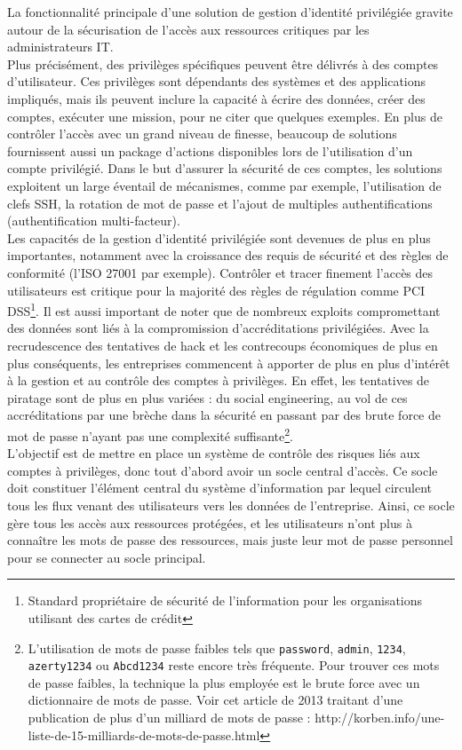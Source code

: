 La fonctionnalité principale d’une solution de gestion d’identité privilégiée gravite autour de la sécurisation de l’accès aux ressources critiques par les administrateurs IT.\\
Plus précisément, des privilèges spécifiques peuvent être délivrés à des comptes d’utilisateur. Ces privilèges sont dépendants des systèmes et des applications impliqués, mais ils peuvent inclure la capacité à écrire des données, créer des comptes, exécuter une mission, pour ne citer que quelques exemples. En plus de contrôler l’accès avec un grand niveau de finesse, beaucoup de solutions fournissent aussi un package d’actions disponibles lors de l’utilisation d’un compte privilégié. Dans le but d’assurer la sécurité de ces comptes, les solutions exploitent un large éventail de mécanismes, comme par exemple, l’utilisation de clefs SSH, la rotation de mot de passe et l’ajout de multiples authentifications (authentification multi-facteur).\\
Les capacités de la gestion d’identité privilégiée sont devenues de plus en plus importantes, notamment avec la croissance des requis de sécurité et des règles de conformité (l’ISO 27001 par exemple). Contrôler et tracer finement l’accès des utilisateurs est critique pour la majorité des règles de régulation comme PCI DSS\footnote{Standard propriétaire de sécurité de l’information pour les organisations utilisant des cartes de crédit}. Il est aussi important de noter que de nombreux exploits compromettant des données sont liés à la compromission d’accréditations privilégiées. Avec la recrudescence des tentatives de hack et les contrecoups économiques de plus en plus conséquents, les entreprises commencent à apporter de plus en plus d’intérêt à la gestion et au contrôle des comptes à privilèges. En effet, les tentatives de piratage sont de plus en plus variées : du social engineering, au vol de ces accréditations par une brèche dans la sécurité en passant par des brute force de mot de passe n’ayant pas une complexité suffisante\footnote{L'utilisation de mots de passe faibles tels que \texttt{password}, \texttt{admin}, \texttt{1234}, \texttt{azerty1234} ou \texttt{Abcd1234} reste encore très fréquente. Pour trouver ces mots de passe faibles, la technique la plus employée est le brute force avec un dictionnaire de mots de passe. Voir cet article de 2013 traitant d’une publication de plus d’un milliard de mots de passe : http://korben.info/une-liste-de-15-milliards-de-mots-de-passe.html}.\\
L’objectif est de mettre en place un système de contrôle des risques liés aux comptes à privilèges, donc tout d’abord avoir un socle central d’accès. Ce socle doit constituer l’élément central du système d'information par lequel circulent tous les flux venant des utilisateurs vers les données de l’entreprise. Ainsi, ce socle gère tous les accès aux ressources protégées, et les utilisateurs n’ont plus à connaître les mots de passe des ressources, mais juste leur mot de passe personnel pour se connecter au socle principal.\\
